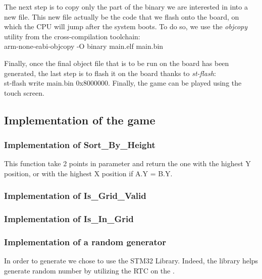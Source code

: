 The next step is to copy only the part of the binary we are interested in into
a new file. This new file actually be the code that we flash onto the board,
on which the CPU will jump after the system boots. To do so, we use the
\textit{objcopy} utility from the cross-compilation toolchain:\\
arm-none-eabi-objcopy -O binary main.elf main.bin

Finally, once the final object file that is to be run on the board has been
generated, the last step is to flash it on the board thanks to \textit{st-flash}:\\
st-flash write main.bin 0x8000000. Finally, the game can be played using the
touch screen.
\newpage

\subsection{Implementation of the game}

\subsubsection{Implementation of Sort\_By\_Height}

\noindent
This function take 2 points in parameter and return the one with the highest Y
position, or with the highest X position if A.Y = B.Y.


\subsubsection{Implementation of Is\_Grid\_Valid}


\subsubsection{Implementation of Is\_In\_Grid}


\subsubsection{Implementation of a random \sq generator}

In order to generate \sqs we chose to use the STM32 Library.
Indeed, the library helps generate random number by utilizing the RTC on the \stmdb.

